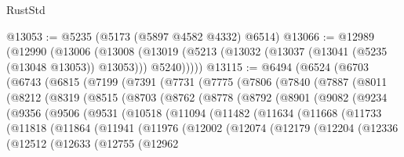 \begin{lexlean}{RustStd}
\begin{coremodule}
@13053 := @5235 (@5173 (@5897 @4582 @4332) @6514)
@13066 := @12989
    (@12990
      (@13006
        (@13008 (@13019 (@5213 (@13032 (@13037 (@13041 (@5235 (@13048 @13053)) @13053))) @5240)))))
@13115 := @6494
    (@6524
      (@6703
        (@6743
          (@6815
            (@7199
              (@7391
                (@7731
                  (@7775
                    (@7806
                      (@7840
                        (@7887
                          (@8011
                            (@8212
                              (@8319
                                (@8515
                                  (@8703
                                    (@8762
                                      (@8778
                                        (@8792
                                          (@8901
                                            (@9082
                                              (@9234
                                                (@9356
                                                  (@9506
                                                    (@9531
                                                      (@10518
                                                        (@11094
                                                          (@11482
                                                            (@11634
                                                              (@11668
                                                                (@11733
                                                                  (@11818
                                                                    (@11864
                                                                      (@11941
                                                                        (@11976
                                                                          (@12002
                                                                            (@12074
                                                                              (@12179
                                                                                (@12204
                                                                                  (@12336
                                                                                    (@12512
                                                                                      (@12633
                                                                                        (@12755
                                                                                          (@12962

\end{coremodule}
\end{lexlean}
